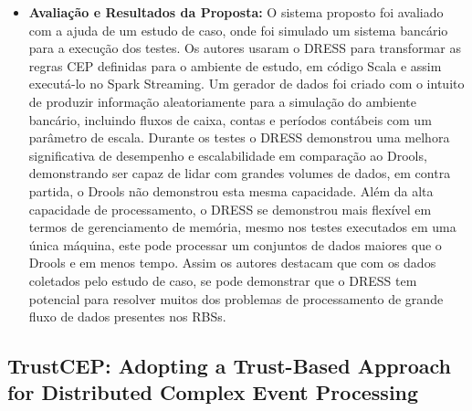 \documentclass[tid,table]{texufpel} %
\begin{document}
\begin{itemize}
	\item \textbf{Avaliação e Resultados da Proposta:} O sistema proposto foi avaliado com a ajuda de um estudo de caso, onde foi simulado um sistema bancário para a execução dos testes. Os autores usaram o DRESS para transformar as regras CEP definidas para o ambiente de estudo, em código Scala e assim executá-lo no Spark Streaming. Um gerador de dados foi criado com o intuito de produzir informação aleatoriamente para a simulação do ambiente bancário, incluindo fluxos de caixa, contas e períodos contábeis com um parâmetro de escala. Durante os testes o DRESS demonstrou uma melhora significativa de desempenho e escalabilidade em comparação ao Drools, demonstrando ser capaz de lidar com grandes volumes de dados, em contra partida, o Drools não demonstrou esta mesma capacidade. Além  da alta capacidade de processamento, o DRESS se demonstrou mais flexível em termos de gerenciamento de memória, mesmo nos testes executados em uma única máquina, este pode processar um conjuntos de dados maiores que o Drools e em menos tempo. Assim os autores destacam que com os dados coletados pelo estudo de caso, se pode demonstrar que o DRESS tem potencial para resolver muitos dos problemas de processamento de grande fluxo de dados presentes nos RBSs.
	
\end{itemize}

\subsection{TrustCEP: Adopting a Trust-Based Approach for Distributed Complex Event Processing}
\end{document}
